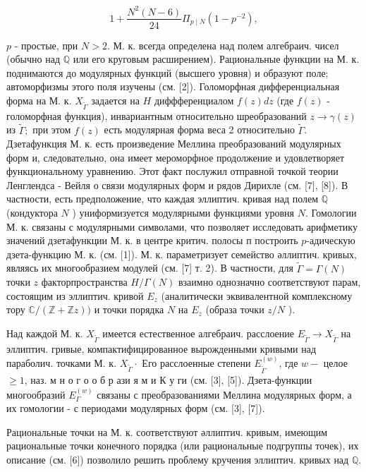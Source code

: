 \documentclass[10pt]{article}
\begin{document}
\[

1+\frac{N^{2}(N-6)}{24} \Pi_{p \mid N}\left(1-p^{-2}\right),

\]



$p$ - простые, при $N>2$. М. к. всегда определена над полем алгебраич. чисел (обычно над $\mathbb{Q}$ или его круговым расширением). Рациональные функции на М. к. поднимаются до модулярных функций (высшего уровня) и образуют поле; автоморфизмы этого поля изучены (см. [2]). Голоморфная дифференциальная форма на М. к. $X_{\tilde{\Gamma}}$ задается на $H$ диффференциалом $f(z) d z$ (где $f(z)$ - голоморфная функция), инвариантным относительно шреобразований $z \rightarrow \gamma(z)$ из $\tilde{\Gamma} ;$ при этом $f(z)$ есть модулярная форма веса 2 относительно $\tilde{\Gamma}$. Дзетафункция М. к. есть произведение Меллина преобразований модулярных форм и, следовательно, она имеет мероморфное продолжение и удовлетворяет функциональному уравнению. Этот факт послужил отправной точкой теории Ленглендса - Вейля о связи модулярных форм и рядов Дирихле (см. [7], [8]). В частности, есть предположение, что каждая эллиптич. кривая над полем $\mathbb{Q}$ (кондуктора $N$ ) униформизуется модулярными функциями уровня $N$. Гомологии М. к. связаны с модулярными символами, что позволяет исследовать арифметику значений дзетафункции М. к. в центре критич. полосы п построить $p$-адическую дзета-функцию М. к. (см. [1]). М. к. параметризует семейство әллиптич. кривых, являясь их многообразием модулей (см. [7] т. 2). В частности, для $\tilde{\Gamma}=\Gamma(N)$ точки $z$ факторпространства $H / \Gamma(N)$ взаимно однозначно соответствуют парам, состоящим из эллиптич. кривой $E_{z}$ (аналитически эквивалентной комплексному тору $\mathbb{C} /(\mathbb{Z}+\mathbb{Z} z))$ и точки порядка $N$ на $E_{z}$ (образа точки $z / N$ ).



Над каждой М. к. $X_{\tilde{\Gamma}}$ имеется естественное алгебраич. расслоение $E_{\tilde{\Gamma}} \rightarrow X_{\tilde{\Gamma}}$ на эллиптич. гривые, компактифицированное вырожденными кривыми над параболич. точками М. к. $X_{\tilde{\Gamma}} \cdot$ Его расслоенные степени $E_{\tilde{\Gamma}}^{(w)}$, где $w-$ целое $\geqslant 1$, наз. м н о г о о б р ази я м и К у ги (см. [3], [5]). Дзета-функции многообразий $E_{\Gamma}^{(w)}$ связаны с преобразованиями Меллина модулярных форм, а их гомологии - с периодами модулярных форм (см. [3], [7]).



Рациональные точки на М. к. соответствуют әллиптич. кривым, имеющим рациональные точки конечного порядка (или рациональные подгруппы точек), их описание (см. [6]) позволило решить проблему кручения эллиптич. кривых над $\mathbb{Q}$.
\end{document}
